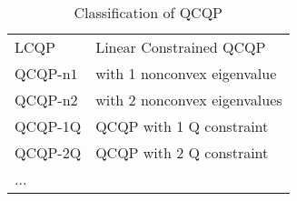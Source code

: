 \documentclass{article}
\newcommand{\textdots}{...}
\begin{document}
\begin{table}[h]
  \begin{tabular}{ll}
    LCQP & Linear Constrained QCQP\\
    QCQP-n$1$ & with 1 nonconvex eigenvalue\\
    QCQP-n$2$ & with 2 nonconvex eigenvalues\\
    QCQP-1Q & QCQP with 1 Q constraint\\
    QCQP-2Q & QCQP with 2 Q constraint\\
    {\textdots} & 
  \end{tabular}
  \caption{Classification of QCQP }
\end{table}
\end{document}
